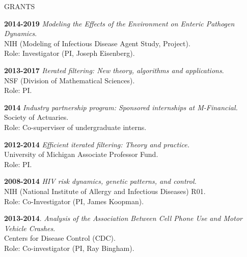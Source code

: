\begin{mylist} {GRANTS}
\item{\bf 2014-2019 } {\em Modeling the Effects of the Environment on Enteric Pathogen Dynamics}.
\\
NIH (Modeling of Infectious Disease Agent Study, Project).
\\
Role: Investigator (PI, Joseph Eisenberg).

\item{\bf 2013-2017 } {\em Iterated filtering: New theory, algorithms and applications}.\\
NSF (Division of Mathematical Sciences).
\\
  Role: PI.


\item{\bf 2014 } {\em  Industry partnership program: Sponsored internships at M-Financial.}\\
Society of Actuaries.\\
Role: Co-superviser of undergraduate interns.

\item{\bf 2012-2014 } {\em Efficient iterated filtering: Theory and practice.}\\
University of Michigan Associate Professor Fund.\\
Role: PI.


\item{\bf 2008-2014 } {\em HIV risk dynamics, genetic patterns, and control.}\\
NIH (National Institute of Allergy and Infectious Diseases) R01.
\\
Role: Co-Investigator (PI, James Koopman).


\item {\bf 2013-2014}. {\em Analysis of the Association Between Cell Phone Use and Motor Vehicle Crashes}.\\
  Centers for Disease Control (CDC).
  \\
  Role: Co-investigator (PI, Ray Bingham).


\end{mylist}
